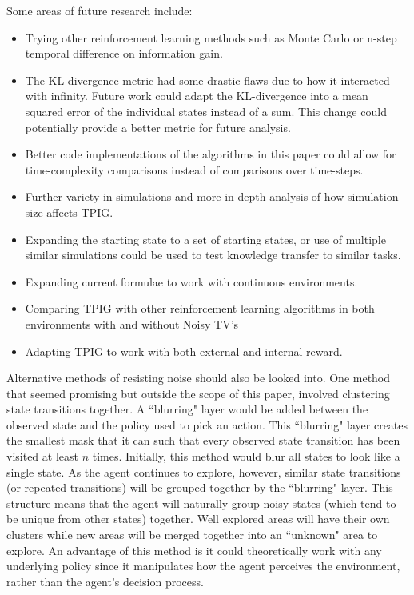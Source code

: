 \documentclass[12pt]{thesis}
\begin{document}
Some areas of future research include:
\begin{itemize}
	\item Trying other reinforcement learning methods such as Monte Carlo or n-step temporal difference on information gain.
	\item The KL-divergence metric had some drastic flaws due to how it interacted with infinity. Future work could adapt the KL-divergence into a mean squared error of the individual states instead of a sum. This change could potentially provide a better metric for future analysis.
	\item Better code implementations of the algorithms in this paper could allow for time-complexity comparisons instead of comparisons over time-steps.
	\item Further variety in simulations and more in-depth analysis of how simulation size affects TPIG.
	\item Expanding the starting state to a set of starting states, or use of multiple similar simulations could be used to test knowledge transfer to similar tasks.
	\item Expanding current formulae to work with continuous environments.
	\item Comparing TPIG with other reinforcement learning algorithms in both environments with and without Noisy TV's
	\item Adapting TPIG to work with both external and internal reward.
\end{itemize}

Alternative methods of resisting noise should also be looked into. One method that seemed promising but outside the scope of this paper, involved clustering state transitions together. A ``blurring" layer would be added between the observed state and the policy used to pick an action. This ``blurring" layer creates the smallest mask that it can such that every observed state transition has been visited at least $n$ times. Initially, this method would blur all states to look like a single state. As the agent continues to explore, however, similar state transitions (or repeated transitions) will be grouped together by the ``blurring" layer. This structure means that the agent will naturally group noisy states (which tend to be unique from other states) together. Well explored areas will have their own clusters while new areas will be merged together into an ``unknown" area to explore. An advantage of this method is it could theoretically work with any underlying policy since it manipulates how the agent perceives the environment, rather than the agent's decision process.
\end{document}
